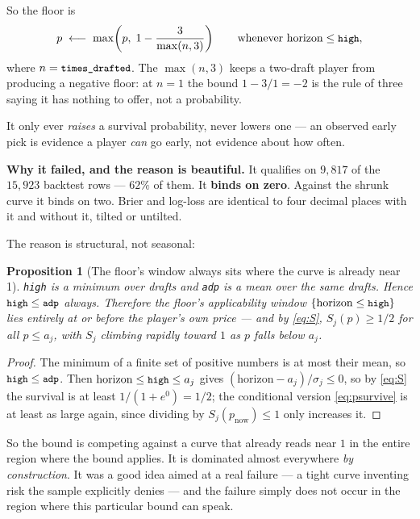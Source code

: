 \documentclass[10pt,a4paper]{article}
\theoremstyle{plain}
\newtheorem{proposition}[theorem]{Proposition}
\theoremstyle{definition}
\theoremstyle{remark}
\newcommand{\code}[1]{\texttt{\small #1}}
\begin{document}
So the floor is
\begin{equation}
p \;\longleftarrow\; \max\!\left(p,\; 1 - \frac{3}{\max(n, 3)}\right)
\qquad\text{whenever } \text{horizon} \le \code{high},
\label{eq:floor}
\end{equation}
where $n = \code{times\_drafted}$. The $\max(n,3)$ keeps a two-draft player from
producing a negative floor: at $n=1$ the bound $1 - 3/1 = -2$ is the rule of three saying
it has nothing to offer, not a probability.

It only ever \emph{raises} a survival probability, never lowers one --- an observed early
pick is evidence a player \emph{can} go early, not evidence about how often.

\textbf{Why it failed, and the reason is beautiful.} It qualifies on $9{,}817$ of the
$15{,}923$ backtest rows --- $62\%$ of them. It \textbf{binds on zero}. Against the
shrunk curve it binds on two. Brier and log-loss are identical to four decimal places
with it and without it, tilted or untilted.

The reason is structural, not seasonal:

\begin{proposition}[The floor's window always sits where the curve is already near 1]
\label{prop:floordead}
\code{high} is a \emph{minimum} over drafts and \code{adp} is a \emph{mean} over the same
drafts. Hence $\code{high} \le \code{adp}$ always. Therefore the floor's applicability
window $\{\text{horizon} \le \code{high}\}$ lies entirely at or before the player's own
price --- and by \eqref{eq:S}, $S_j(p) \ge 1/2$ for all $p \le a_j$, with $S_j$ climbing
rapidly toward $1$ as $p$ falls below $a_j$.
\end{proposition}

\begin{proof}
The minimum of a finite set of positive numbers is at most their mean, so
$\code{high} \le \code{adp}$. Then $\text{horizon} \le \code{high} \le a_j$ gives
$(\text{horizon} - a_j)/\sigma_j \le 0$, so by \eqref{eq:S} the survival is at least
$1/(1+e^0) = 1/2$; the conditional version \eqref{eq:psurvive} is at least as large again,
since dividing by $S_j(p_{\text{now}}) \le 1$ only increases it.
\end{proof}

So the bound is competing against a curve that already reads near $1$ in the entire
region where the bound applies. It is dominated almost everywhere \emph{by construction}.
It was a good idea aimed at a real failure --- a tight curve inventing risk the sample
explicitly denies --- and the failure simply does not occur in the region where this
particular bound can speak.
\end{document}
